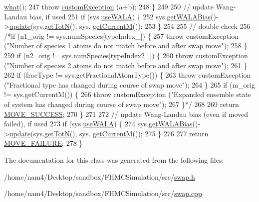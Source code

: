 \begin{DoxyCode}
      \hyperlink{classcustom_exception_aeb6ab5848b038adfc68fde86a512f691}{what}();
247             \textcolor{keywordflow}{throw} \hyperlink{classcustom_exception}{customException} (a+b);
248         \}
249 
250         \textcolor{comment}{// update Wang-Landau bias, if used}
251         \textcolor{keywordflow}{if} (sys.\hyperlink{classsim_system_aa83b00006b3919fb6e13f1bdeadece6a}{useWALA}) \{
252             sys.\hyperlink{classsim_system_a7cb5049de8b0988349e89e30e4000407}{getWALABias}()->\hyperlink{classwala_ab439e3f60bea6c54522a870b9ad67acf}{update}(sys.\hyperlink{classsim_system_a37dd827f4057049763351510147b9f1d}{getTotN}(), sys.
      \hyperlink{classsim_system_a299fe4372e610b554eaaf5f5957b2dbc}{getCurrentM}());
253         \}
254 
255         \textcolor{comment}{// double check}
256         \textcolor{comment}{/*if (n1\_orig != sys.numSpecies[typeIndex\_]) \{}
257 \textcolor{comment}{            throw customException ("Number of species 1 atoms do not match before and after swap move");}
258 \textcolor{comment}{        \}}
259 \textcolor{comment}{        if (n2\_orig != sys.numSpecies[typeIndex2\_]) \{}
260 \textcolor{comment}{            throw customException ("Number of species 2 atoms do not match before and after swap move");}
261 \textcolor{comment}{        \}}
262 \textcolor{comment}{        if (fracType != sys.getFractionalAtomType()) \{}
263 \textcolor{comment}{            throw customException ("Fractional type has changed during course of swap move");}
264 \textcolor{comment}{        \}}
265 \textcolor{comment}{        if (m\_orig != sys.getCurrentM()) \{}
266 \textcolor{comment}{            throw customException ("Expanded ensemble state of system has changed during course of swap
       move");}
267 \textcolor{comment}{        \}*/}
268 
269     \textcolor{keywordflow}{return} \hyperlink{moves_8h_ae8285cbddc5d21f73f49dcbad82a775a}{MOVE\_SUCCESS};
270         \}
271 
272     \textcolor{comment}{// update Wang-Landau bias (even if moved failed), if used}
273     \textcolor{keywordflow}{if} (sys.\hyperlink{classsim_system_aa83b00006b3919fb6e13f1bdeadece6a}{useWALA}) \{
274         sys.\hyperlink{classsim_system_a7cb5049de8b0988349e89e30e4000407}{getWALABias}()->\hyperlink{classwala_ab439e3f60bea6c54522a870b9ad67acf}{update}(sys.\hyperlink{classsim_system_a37dd827f4057049763351510147b9f1d}{getTotN}(), sys.
      \hyperlink{classsim_system_a299fe4372e610b554eaaf5f5957b2dbc}{getCurrentM}());
275     \}
276 
277     \textcolor{keywordflow}{return} \hyperlink{moves_8h_a9832cf5fcfa8c0894545b591c9908e39}{MOVE\_FAILURE};
278 \}
\end{DoxyCode}


The documentation for this class was generated from the following files\-:\begin{DoxyCompactItemize}
\item 
/home/nam4/\-Desktop/sandbox/\-F\-H\-M\-C\-Simulation/src/\hyperlink{swap_8h}{swap.\-h}\item 
/home/nam4/\-Desktop/sandbox/\-F\-H\-M\-C\-Simulation/src/\hyperlink{swap_8cpp}{swap.\-cpp}\end{DoxyCompactItemize}
